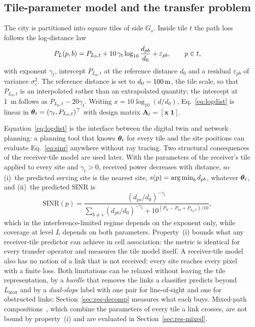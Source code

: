 \subsection{Tile-parameter model and the transfer problem}
\label{sec:transfer}

The city is partitioned into square tiles of side $G_s$. Inside tile $t$ the
path loss follows the log-distance law~\cite{rappaport2002,erceg1999}
\begin{equation}
P_{L}(p,b)=P_{L_0,t}+10\,\gamma_t\log_{10}\frac{d_{pb}}{d_0}+\varepsilon_{pb},
\qquad p\in t,
\label{eq:logdist}
\end{equation}
with exponent $\gamma_t$, intercept $P_{L_0,t}$ at the reference distance
$d_0$ and a residual $\varepsilon_{pb}$ of variance $\sigma_\varepsilon^2$.
The reference distance is set to $d_0=\SI{100}{\metre}$, the tile
scale, so that $P_{L_0,t}$ is an interpolated rather than an extrapolated
quantity; the intercept at \SI{1}{\metre} follows as $P_{L_0,t}-20\gamma_t$.
Writing $x=10\log_{10}(d/d_0)$, Eq.~\eqref{eq:logdist} is linear in
$\boldsymbol{\theta}_t=(\gamma_t,P_{L_0,t})^{\top}$ with design matrix
$\mathbf{A}_t=[\mathbf{x}\;\mathbf{1}]$.

Equation~\eqref{eq:logdist} is the interface between the digital twin and
network planning: a planning tool that knows $\boldsymbol{\theta}_t$ for every tile and
the site positions can evaluate Eq.~\eqref{eq:sinr} anywhere without ray
tracing. Two structural consequences of the receiver-tile model are used
later. With the parameters of the receiver's tile applied to every site and
$\gamma_t>0$, received power decreases with distance, so (i)~the predicted
serving site is the nearest site, $s(p)=\operatorname*{arg\,min}_b d_{pb}$, whatever
$\boldsymbol{\theta}_t$, and (ii)~the predicted SINR is
\begin{equation}
\mathrm{SINR}(p)=\frac{(d_{ps}/d_0)^{-\gamma_t}}
{\sum_{b\neq s}(d_{pb}/d_0)^{-\gamma_t}
+10^{(P_{\mathrm{N}}-P_{\mathrm{tx}}+P_{L_0,t})/10}},
\label{eq:sinrtile}
\end{equation}
which in the interference-limited regime depends on the exponent only, while
coverage at level $L$ depends on both parameters. Property~(i) bounds what
any receiver-tile predictor can achieve in cell association: the metric is
identical for every transfer operator and measures the tile model itself. A
receiver-tile model also has no notion of a link that is not received: every
site reaches every pixel with a finite loss. Both limitations can be relaxed
without leaving the tile representation, by a \emph{hurdle} that removes the
links a classifier predicts beyond $L_{\max}$ and by a \emph{dual-slope}
label with one pair for line-of-sight and one for obstructed links;
Section~\ref{sec:res-decomp} measures what each buys. Mixed-path
compositions~\cite{ozyurt2020maple,ozyurt2026}, which combine the parameters
of every tile a link crosses, are not bound by property~(i) and are
evaluated in Section~\ref{sec:res-mixed}.


